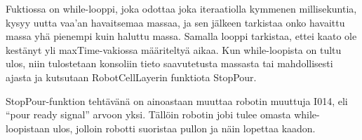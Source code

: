 Fuktiossa on while-looppi, joka odottaa joka iteraatiolla kymmenen millisekuntia, kysyy uutta vaa'an havaitsemaa massaa, ja sen jälkeen tarkistaa onko havaittu massa yhä pienempi kuin haluttu massa. Samalla looppi tarkistaa, ettei kaato ole kestänyt yli maxTime-vakiossa määriteltyä aikaa. Kun while-loopista on tultu ulos, niin tulostetaan konsoliin tieto saavutetusta massasta tai mahdollisesti ajasta ja kutsutaan RobotCellLayerin funktiota StopPour.

StopPour-funktion tehtävänä on ainoastaan muuttaa robotin muuttuja I014, eli ``pour ready signal'' arvoon yksi. Tällöin robotin jobi tulee omasta while-loopistaan ulos, jolloin robotti suoristaa pullon ja näin lopettaa kaadon.
